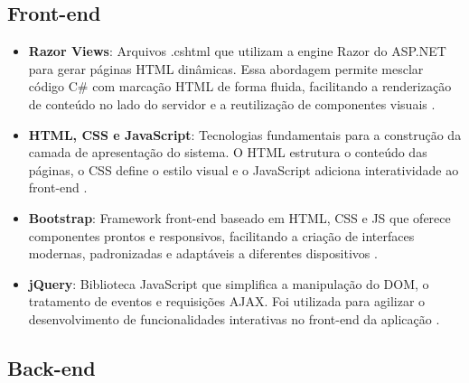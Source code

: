 \documentclass[
	12pt,				%
	openany,			%
	twoside,			%
	a4paper,			%
	english,			%
	brazil				%
	]{abntex2}
\begin{document}
\subsection{Front-end}

\begin{itemize}

   \item \textbf{Razor Views}: Arquivos .cshtml que utilizam a engine Razor do ASP.NET para gerar páginas HTML dinâmicas. Essa abordagem permite mesclar código C\# com marcação HTML de forma fluida, facilitando a renderização de conteúdo no lado do servidor e a reutilização de componentes visuais \cite{Razor}.

   \item \textbf{HTML, CSS e JavaScript}: Tecnologias fundamentais para a construção da camada de apresentação do sistema. O HTML estrutura o conteúdo das páginas, o CSS define o estilo visual e o JavaScript adiciona interatividade ao front-end \cite{FrontEnd}.

   \item \textbf{Bootstrap}: Framework front-end baseado em HTML, CSS e JS que oferece componentes prontos e responsivos, facilitando a criação de interfaces modernas, padronizadas e adaptáveis a diferentes dispositivos \cite{Bootstrap}.

   \item \textbf{jQuery}: Biblioteca JavaScript que simplifica a manipulação do DOM, o tratamento de eventos e requisições AJAX. Foi utilizada para agilizar o desenvolvimento de funcionalidades interativas no front-end da aplicação \cite{JQuery}.

\end{itemize}


\subsection{Back-end}
\end{document}
